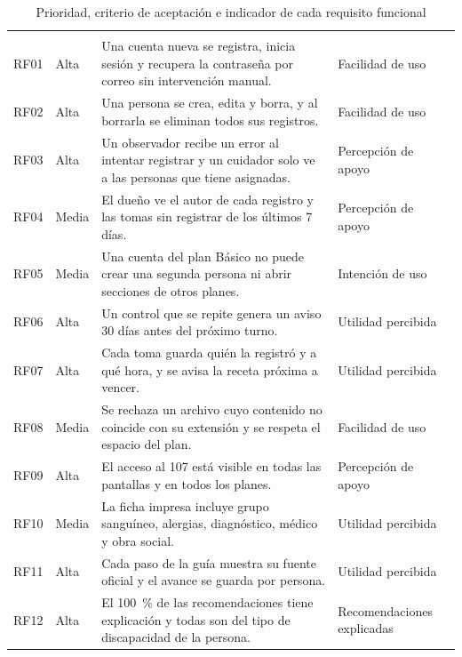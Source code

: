 {\small
\begin{xltabular}{\textwidth}{l l >{\raggedright\arraybackslash}X >{\raggedright\arraybackslash}p{3.2cm}}
\caption{Prioridad, criterio de aceptación e indicador de cada requisito funcional}\label{tab:rf-criterios}\\
\toprule
{} &  &  &  \\
\midrule
\endfirsthead
\toprule
{} &  &  &  \\
\midrule
\endhead
\bottomrule
\endfoot
RF01 & Alta & Una cuenta nueva se registra, inicia sesión y recupera la contraseña por correo sin intervención manual. & Facilidad de uso \\
RF02 & Alta & Una persona se crea, edita y borra, y al borrarla se eliminan todos sus registros. & Facilidad de uso \\
RF03 & Alta & Un observador recibe un error al intentar registrar y un cuidador solo ve a las personas que tiene asignadas. & Percepción de apoyo \\
RF04 & Media & El dueño ve el autor de cada registro y las tomas sin registrar de los últimos 7 días. & Percepción de apoyo \\
RF05 & Media & Una cuenta del plan Básico no puede crear una segunda persona ni abrir secciones de otros planes. & Intención de uso \\
RF06 & Alta & Un control que se repite genera un aviso 30 días antes del próximo turno. & Utilidad percibida \\
RF07 & Alta & Cada toma guarda quién la registró y a qué hora, y se avisa la receta próxima a vencer. & Utilidad percibida \\
RF08 & Media & Se rechaza un archivo cuyo contenido no coincide con su extensión y se respeta el espacio del plan. & Facilidad de uso \\
RF09 & Alta & El acceso al 107 está visible en todas las pantallas y en todos los planes. & Percepción de apoyo \\
RF10 & Media & La ficha impresa incluye grupo sanguíneo, alergias, diagnóstico, médico y obra social. & Utilidad percibida \\
RF11 & Alta & Cada paso de la guía muestra su fuente oficial y el avance se guarda por persona. & Utilidad percibida \\
RF12 & Alta & El 100~\% de las recomendaciones tiene explicación y todas son del tipo de discapacidad de la persona. & Recomendaciones explicadas \\

\end{xltabular}}
